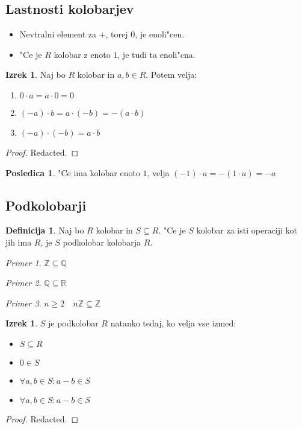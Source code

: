 \documentclass[11pt, a4paper]{article}
\theoremstyle{definition}
\newtheorem{defn}[counter]{Definicija}
\newtheorem{conseq}[counter]{Posledica}
\newtheorem{theorem}[counter]{Izrek}
\theoremstyle{remark}
\newtheorem*{ex}{Primer}
\newcommand{\Z}{\mathbb{Z}}
\newcommand{\Q}{\mathbb{Q}}
\newcommand{\R}{\mathbb{R}}
\begin{document}
	\subsection{Lastnosti kolobarjev}	
	\begin{itemize}
		\item Nevtralni element za $+$, torej $0$, je enoli"cen.
		\item "Ce je $R$ kolobar z enoto $1$, je tudi ta enoli"cna.
	\end{itemize}
	\begin{theorem}
		Naj bo $R$ kolobar in $a,b \in R$. Potem velja:
		\begin{enumerate}
			\item $0 \cdot a = a \cdot 0 = 0$
			\item $(-a) \cdot b = a \cdot (-b) = -(a \cdot b)$
			\item $(-a) \cdot (-b) = a \cdot b$
		\end{enumerate}
	\end{theorem}
	\begin{proof}
		Redacted.
	\end{proof}

	\begin{conseq}
		"Ce ima kolobar enoto $1$, velja $(-1) \cdot a = -(1 \cdot a) = -a$
	\end{conseq}

	\subsection{Podkolobarji}
	\begin{defn}
		Naj bo $R$ kolobar in $S \subseteq R$. "Ce je $S$ kolobar za isti operaciji kot jih ima $R$, je $S$ podkolobar kolobarja $R$.
	\end{defn}
	\begin{ex}
		$\Z \subseteq \Q$
	\end{ex}
	\begin{ex}
		$\Q \subseteq \R$
	\end{ex}
	\begin{ex}
		$n \geq 2 \quad n\Z \subseteq \Z$
	\end{ex}

	\begin{theorem}\label{podkolobar}
		$S$ je podkolobar $R$ natanko tedaj, ko velja vse izmed:
		\begin{itemize}
			\item $S \subseteq R$
			\item $0 \in S$
			\item $\forall a,b \in S: a-b \in S$
			\item $\forall a,b \in S: a-b \in S$
		\end{itemize}
	\end{theorem}
	\begin{proof}
		Redacted.
	\end{proof}
\end{document}
